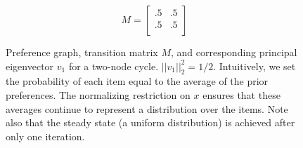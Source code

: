 \begin{figure}[!htb] %
\centering
\begin{minipage}{1.2in}
\end{minipage}
\hfill
\begin{minipage}{1.2in}
\[
M=
  \begin{bmatrix}
    .5 & .5 \\
    .5 & .5 \\
  \end{bmatrix}
\]
\end{minipage}
\hfill
\begin{minipage}{1.2in}
\end{minipage}
\caption{Preference graph, transition matrix $M$, and corresponding principal eigenvector $v_1$ for a two-node cycle. $||v_1||_2^2 = 1/2$. Intuitively, we set the probability of each item equal to the average of the prior preferences. The normalizing restriction on $x$ ensures that these averages continue to represent a distribution over the items. Note also that the steady state (a uniform distribution) is achieved after only one iteration.}
\label{fig:linalg_2} 
\end{figure}



